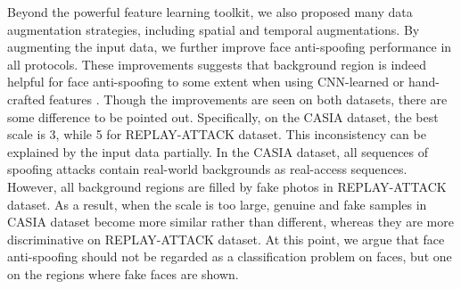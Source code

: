 \documentclass[letterpaper, 10 pt, conference]{ieeeconf}
\begin{document}
Beyond the powerful feature learning toolkit, we also proposed many data augmentation strategies, including spatial and temporal augmentations. By augmenting the input data, we further improve face anti-spoofing performance in all protocols. These improvements suggests that background region is indeed helpful for face anti-spoofing to some extent when using CNN-learned or hand-crafted features \cite{Face_Anti_Spoofing_JianweiYang_2013}. Though the improvements are seen on both datasets, there are some difference to be pointed out. Specifically, on the CASIA dataset, the best scale is 3, while 5 for REPLAY-ATTACK dataset. This inconsistency can be explained by the input data partially. In the CASIA dataset, all sequences of spoofing attacks contain real-world backgrounds as real-access sequences. However, all background regions are filled by fake photos in REPLAY-ATTACK dataset. As a result, when the scale is too large, genuine and fake samples in CASIA dataset become more similar rather than different, whereas they are more discriminative on REPLAY-ATTACK dataset. At this point, we argue that face anti-spoofing should not be regarded as a classification problem on faces, but one on the regions where fake faces are shown.
\end{document}
